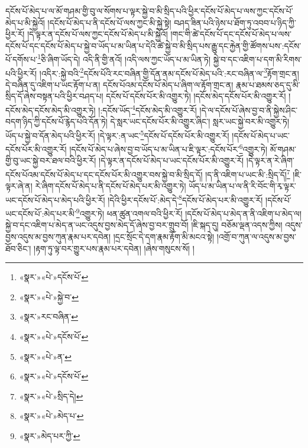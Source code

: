 དངོས་པོ་མེད་པ་ལ་མོ་གཤམ་གྱི་བུ་ལ་སོགས་པ་ལྟར་སྐྱེ་བ་མི་སྲིད་པའི་ཕྱིར་དངོས་པོ་མེད་པ་ལས་ཀྱང་དངོས་པོ་མེད་པ་མི་སྐྱེའོ། །དངོས་པོ་མེད་པ་ནི་དངོས་པོ་ལས་ཀྱང་མི་སྐྱེ་སྟེ། བཤད་ཟིན་པའི་ཉེས་པ་ཐོག་ཏུ་འབབ་པ་ཉིད་ཀྱི་ཕྱིར་རོ། །དེ་ལྟར་ན་དངོས་པོ་ལས་ཀྱང་དངོས་པོ་མེད་པ་མི་སྐྱེའོ། །གང་གི་ཚེ་དངོས་པོ་དང་དངོས་པོ་མེད་པ་ལས་དངོས་པོ་དང་དངོས་པོ་མེད་པ་སྐྱེ་བ་ཡོད་པ་མ་ཡིན་པ་དེའི་ཚེ་སྐྱེ་བ་མི་སྲིད་པས་རྒྱུ་དང་རྐྱེན་གྱི་ཚོགས་པས་:དངོས་པོ་དགོས་པ་\footnote{«སྣར་»«པེ་»དངོས་པོ་}ཅི་ཞིག་ཡོད་དེ། འདི་ནི་གྱི་ནའོ། །འདི་ལས་ཀྱང་ཡོད་པ་མ་ཡིན་ཏེ། སྐྱེ་བ་དང་འཇིག་པ་དག་མི་རིགས་པའི་ཕྱིར་རོ། །འདིར་:སྐྱེ་བའི་\footnote{«སྣར་»«པེ་»སྐྱེ་བ་}དངོས་པོའི་རང་བཞིན་གྱི་དོན་ནམ་དངོས་པོ་མེད་པའི་:རང་བཞིན་ལ་\footnote{«སྣར་»རང་བཞིན་}རྟོག་གྲང་ན། དེ་བཞིན་དུ་འཇིག་པ་ཡང་རྟོག་པ་ན། དངོས་པོའམ་དངོས་པོ་མེད་པ་ཞིག་ལ་རྟོག་གྲང་ན། རྣམ་པ་ཐམས་ཅད་དུ་མི་སྲིད་དོ་ཞེས་བསྟན་པའི་ཕྱིར་བཤད་པ། དངོས་པོ་དངོས་པོར་མི་འགྱུར་ཏེ། །དངོས་མེད་དངོས་པོར་མི་འགྱུར་རོ། །དངོས་མེད་དངོས་མེད་མི་འགྱུར་ཏེ། །:དངོས་ཡོད་\footnote{«སྣར་»«པེ་»དངོས་པོ་}དངོས་མེད་མི་འགྱུར་རོ། །དེ་ལ་དངོས་པོ་ཞེས་བྱ་བ་ནི་སྐྱེས་ཤིང་བདག་ཉིད་ཀྱི་དངོས་པོ་རྙེད་པའི་དོན་ཏེ། དེ་སླར་ཡང་དངོས་པོར་མི་འགྱུར་ཞིང་། སླར་ཡང་སྐྱེ་བར་མི་འགྱུར་ཏེ། ཡོད་པ་སྐྱེ་བ་དོན་མེད་པའི་ཕྱིར་རོ། །དེ་ལྟར་:ན་ཡང་\footnote{«སྣར་»«པེ་»ན་}དངོས་པོ་དངོས་པོར་མི་འགྱུར་རོ། །དངོས་པོ་མེད་པ་ཡང་དངོས་པོར་མི་འགྱུར་རོ། །དངོས་པོ་མེད་པ་ཞེས་བྱ་བ་ཡོད་པ་མ་ཡིན་པ་ཇི་ལྟར་:དངོས་པོར་\footnote{«སྣར་»«པེ་»དངོས་པོ་}འགྱུར་ཏེ། མོ་གཤམ་གྱི་བུ་ཡང་སྐྱེ་བར་ཐལ་བའི་ཕྱིར་རོ། །དེ་ལྟར་ན་དངོས་པོ་མེད་པ་ཡང་དངོས་པོར་མི་འགྱུར་རོ། །དེ་ལྟར་ན་རེ་ཞིག་དངོས་པོའམ་དངོས་པོ་མེད་པ་དང་དངོས་པོར་མི་འགྱུར་བས་སྐྱེ་བ་མི་སྲིད་དོ། །ད་ནི་འཇིག་པ་ཡང་མི་:སྲིད་དོ།\footnote{«སྣར་»«པེ་»སྲིད་དེ།} །ཇི་ལྟར་ཞེ་ན། རེ་ཞིག་དངོས་པོ་མེད་པ་ནི་དངོས་པོ་མེད་པར་མི་འགྱུར་ཏེ། ཡོད་པ་མ་ཡིན་པ་ལ་ནི་རི་བོང་གི་རྭ་ལྟར་ཡང་དངོས་པོ་མེད་པ་མེད་པའི་ཕྱིར་རོ། །དེའི་ཕྱིར་དངོས་པོ་:མེད་དེ་\footnote{«སྣར་»«པེ་»མེད་པ་}དངོས་པོ་མེད་པར་མི་འགྱུར་རོ། །དངོས་པོ་ཡང་དངོས་པོ་:མེད་པར་མི་\footnote{«སྣར་»མེད་པར་ཀྱི་}འགྱུར་ཏེ། ཕན་ཚུན་འགལ་བའི་ཕྱིར་རོ། །དངོས་པོ་མེད་པ་མེད་ན་ནི་འཇིག་པ་མེད་ལ། སྐྱེ་བ་དང་འཇིག་པ་མེད་ན་ཡང་འདུས་བྱས་མེད་དོ་ཞེས་བྱ་བར་གྲུབ་བོ། །ཇི་སྐད་དུ། བཅོམ་ལྡན་འདས་ཀྱིས། འདུས་བྱས་འདུས་མ་བྱས་ཀུན་རྣམ་པར་དབེན། །དྲང་སྲོང་དེ་དག་རྣམ་རྟོག་མི་མངའ་སྟེ། །འགྲོ་བ་ཀུན་ལ་འདུས་མ་བྱས་ཐོབ་ཅིང་། །རྟག་ཏུ་ལྟ་བར་གྱུར་པས་རྣམ་པར་དབེན། །ཞེས་གསུངས་སོ། །
